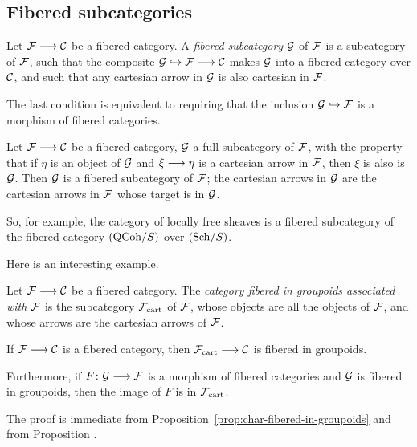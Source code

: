 \begin{3   FIBERED CATEGORIES}
\begin{3.4 Functors and cats fibered in sets}
\subsection{Fibered subcategories}


\begin{definition}
Let $\cF\arr \cC$ be a fibered category. A \emph{fibered subcategory}%
%
 $\mathcal{G}$ of $\mathcal{F}$ is a subcategory of $\mathcal{F}$, such that the composite $\cG \into \cF \arr \cC$ makes $\mathcal{G}$ into a fibered category over $\mathcal{C}$, and such that any cartesian arrow in $\mathcal{G}$ is also cartesian in $\mathcal{F}$.
\end{definition}

The last condition is equivalent to requiring that the inclusion
$\mathcal{G} \hookrightarrow \mathcal{F}$ is a morphism of fibered categories.

\begin{example}
Let $\cF \arr \cC$ be a fibered category, $\mathcal{G}$ a full subcategory of $\mathcal{F}$, with the property that if $\eta$ is an object of $\mathcal{G}$ and $\xi \arr \eta$ is a cartesian arrow in $\mathcal{F}$, then $\xi$ is also is $\mathcal{G}$. Then $\mathcal{G}$ is a fibered subcategory of $\mathcal{F}$; the cartesian arrows in $\mathcal{G}$ are the cartesian arrows in $\mathcal{F}$ whose target is in $\mathcal{G}$.
\end{example}

So, for example, the category of locally free sheaves is a fibered subcategory of the fibered category $({\mathrm{QCoh}/S})$ over $({\mathrm{Sch}/S})$. 

Here is an interesting example.

\begin{definition}\label{def:ass-groupoids}
Let $\cF \arr \cC$ be a fibered category. The \emph{category fibered in groupoids associated with $\mathcal{F}$}%
%
%
\index{$\cF\cart$} is the subcategory $\cF\cart$ of $\mathcal{F}$, whose objects are all the objects of $\mathcal{F}$, and whose arrows are the cartesian arrows of $\mathcal{F}$.
\end{definition}

\begin{proposition}
If $\cF \arr \cC$ is a fibered category, then $\cF\cart \arr \cC$ is fibered in groupoids.

Furthermore, if $F\colon \cG \arr \cF$ is a morphism of fibered categories and $\mathcal{G}$ is fibered in groupoids, then the image of $F$ is in $\cF\cart$.
\end{proposition}

The proof is immediate from Proposition~\ref{prop:char-fibered-in-groupoids} and from Proposition .



\end{3.4 Functors and cats fibered in sets}
\end{3   FIBERED CATEGORIES}

